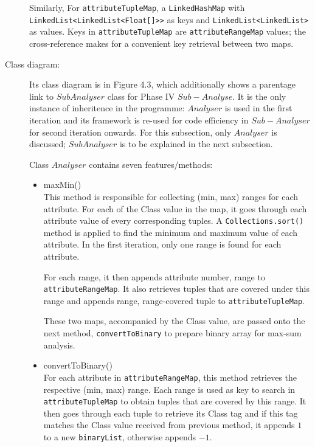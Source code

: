 \begin{description}
Similarly, For \texttt{attributeTupleMap}, a \texttt{LinkedHashMap} with \texttt{LinkedList<LinkedList<Float[]>>} as keys and \texttt{LinkedList<LinkedList>} as values. Keys in \texttt{attributeTupleMap} are \texttt{attributeRangeMap} values; the cross-reference makes for a convenient key retrieval between two maps. 

\item[Class diagram: ] 

Its class diagram is in Figure 4.3, which additionally shows a parentage link to $SubAnalyser$ class for Phase IV $Sub-Analyse$. It is the only instance of inheritence in the programme: $Analyser$ is used in the first iteration and its framework is re-used for code efficiency in $Sub-Analyser$ for second iteration onwards. For this subsection, only $Analyser$ is discussed; $SubAnalyser$ is to be explained in the next subsection.

Class $Analyser$ contains seven features/methods:

\begin{itemize}
	\item{maxMin()} \\
	This method is responsible for collecting (min, max) ranges for each attribute. For each of the Class value in the map, it goes through each attribute value of every corresponding tuples. A \texttt{Collections.sort()} method is applied to find the minimum and maximum value of each attribute. In the first iteration, only one range is found for each attribute.
	
	For each range, it then appends {attribute number, range} to \texttt{attributeRangeMap}. It also retrieves tuples that are covered under this range and appends {range, range-covered tuple} to \texttt{attributeTupleMap}. 
	
	These two maps, accompanied by the Class value, are passed onto the next method, \texttt{convertToBinary} to prepare binary array for max-sum analysis.
	
	\item{convertToBinary()} \\
	For each attribute in \texttt{attributeRangeMap}, this method retrieves the respective (min, max) range. Each range is used as key to search in \texttt{attributeTupleMap} to obtain tuples that are covered by this range. It then goes through each tuple to retrieve its Class tag and if this tag matches the Class value received from previous method, it appends $1$ to a new \texttt{binaryList}, otherwise appends $-1$. 
	

\end{itemize}
\end{description}
